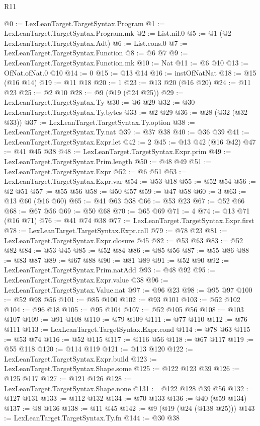 \begin{lexlean}{R11}
\begin{coremodule}
@0 := LexLeanTarget.TargetSyntax.Program
@1 := LexLeanTarget.TargetSyntax.Program.mk
@2 := List.nil.{0}
@5 := @1 (@2 LexLeanTarget.TargetSyntax.Adt)
@6 := List.cons.{0}
@7 := LexLeanTarget.TargetSyntax.Function
@8 := @6 @7
@9 := LexLeanTarget.TargetSyntax.Function.mk
@10 := Nat
@11 := @6 @10
@13 := OfNat.ofNat.{0} @10
@14 := 0
@15 := @13 @14
@16 := instOfNatNat
@18 := @15 (@16 @14)
@19 := @11 @18
@20 := 1
@23 := @13 @20 (@16 @20)
@24 := @11 @23
@25 := @2 @10
@28 := @9 (@19 (@24 @25))
@29 := LexLeanTarget.TargetSyntax.Ty
@30 := @6 @29
@32 := @30 LexLeanTarget.TargetSyntax.Ty.bytes
@33 := @2 @29
@36 := @28 (@32 (@32 @33))
@37 := LexLeanTarget.TargetSyntax.Ty.option
@38 := LexLeanTarget.TargetSyntax.Ty.nat
@39 := @37 @38
@40 := @36 @39
@41 := LexLeanTarget.TargetSyntax.Expr.let
@42 := 2
@45 := @13 @42 (@16 @42)
@47 := @41 @45 @38
@48 := LexLeanTarget.TargetSyntax.Expr.prim
@49 := LexLeanTarget.TargetSyntax.Prim.length
@50 := @48 @49
@51 := LexLeanTarget.TargetSyntax.Expr
@52 := @6 @51
@53 := LexLeanTarget.TargetSyntax.Expr.var
@54 := @53 @18
@55 := @52 @54
@56 := @2 @51
@57 := @55 @56
@58 := @50 @57
@59 := @47 @58
@60 := 3
@63 := @13 @60 (@16 @60)
@65 := @41 @63 @38
@66 := @53 @23
@67 := @52 @66
@68 := @67 @56
@69 := @50 @68
@70 := @65 @69
@71 := 4
@74 := @13 @71 (@16 @71)
@76 := @41 @74 @38
@77 := LexLeanTarget.TargetSyntax.Expr.first
@78 := LexLeanTarget.TargetSyntax.Expr.call
@79 := @78 @23
@81 := LexLeanTarget.TargetSyntax.Expr.closure @45
@82 := @53 @63
@83 := @52 @82
@84 := @53 @45
@85 := @52 @84
@86 := @85 @56
@87 := @55 @86
@88 := @83 @87
@89 := @67 @88
@90 := @81 @89
@91 := @52 @90
@92 := LexLeanTarget.TargetSyntax.Prim.natAdd
@93 := @48 @92
@95 := LexLeanTarget.TargetSyntax.Expr.value @38
@96 := LexLeanTarget.TargetSyntax.Value.nat
@97 := @96 @23
@98 := @95 @97
@100 := @52 @98 @56
@101 := @85 @100
@102 := @93 @101
@103 := @52 @102
@104 := @96 @18
@105 := @95 @104
@107 := @52 @105 @56
@108 := @103 @107
@109 := @91 @108
@110 := @79 @109
@111 := @77 @110
@112 := @76 @111
@113 := LexLeanTarget.TargetSyntax.Expr.cond
@114 := @78 @63
@115 := @53 @74
@116 := @52 @115
@117 := @116 @56
@118 := @67 @117
@119 := @55 @118
@120 := @114 @119
@121 := @113 @120
@122 := LexLeanTarget.TargetSyntax.Expr.build
@123 := LexLeanTarget.TargetSyntax.Shape.some
@125 := @122 @123 @39
@126 := @125 @117
@127 := @121 @126
@128 := LexLeanTarget.TargetSyntax.Shape.none
@131 := @122 @128 @39 @56
@132 := @127 @131
@133 := @112 @132
@134 := @70 @133
@136 := @40 (@59 @134)
@137 := @8 @136
@138 := @11 @45
@142 := @9 (@19 (@24 (@138 @25)))
@143 := LexLeanTarget.TargetSyntax.Ty.fn
@144 := @30 @38

\end{coremodule}
\end{lexlean}
